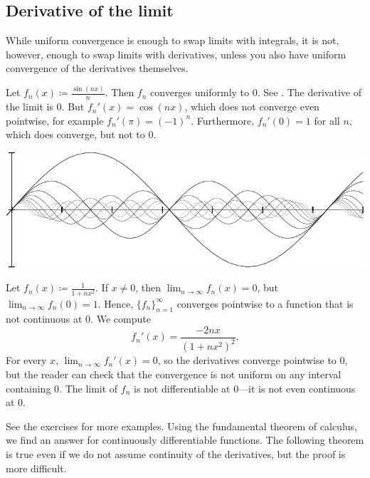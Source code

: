 \subsection{Derivative of the limit}

While uniform convergence is enough to swap limits with integrals, it is not,
however, enough to swap limits with derivatives, unless you also have
uniform convergence of the derivatives themselves.

\begin{example}
Let $f_n(x) \coloneqq \frac{\sin(nx)}{n}$.  Then $f_n$ converges uniformly to
0.  See .
The derivative of the limit is 0.  But $f_n'(x) = \cos(nx)$, which
does not converge even pointwise, for
example $f_n'(\pi) = {(-1)}^n$.  Furthermore,
$f_n'(0) = 1$ for all $n$, which does converge, but not to $0$.
\begin{myfigureht}
\includegraphics{figures/conv1nsinxn}
\caption{Graphs of $\frac{\sin(nx)}{n}$ for
$n=1,2,\ldots,10$, with higher $n$ in lighter gray.%
\label{fig:conv1nsinxn}}
\end{myfigureht}
\end{example}

\begin{example} \label{exercise:badconvergenceder}
Let $f_n(x) \coloneqq \frac{1}{1+nx^2}$.
If $x \not= 0$, then $\lim_{n \to \infty} f_n(x) = 0$,
but $\lim_{n \to \infty} f_n(0) = 1$.
Hence, $\{ f_n \}_{n=1}^\infty$ converges pointwise to a function that is not continuous
at $0$.
We compute
\begin{equation*}
f_n'(x) %
= \frac{-2 n x}{(1+ n x^2)^2} .
\end{equation*}
For every $x$, $\lim_{n\to\infty} f_n'(x) = 0$, so the derivatives
converge pointwise to 0,
but the reader can check that the convergence is not uniform on any
interval containing $0$.
The limit of $f_n$ is not differentiable at $0$---it is not even
continuous at $0$.
\end{example}

See the exercises for more examples.  Using 
the fundamental theorem of calculus, we find an answer for continuously
differentiable functions.  The following theorem is true even if 
we do not assume continuity of the derivatives, but the proof is more
difficult.

